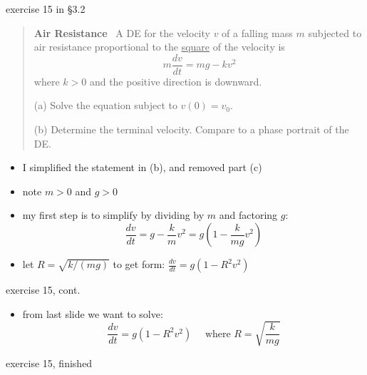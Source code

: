 \documentclass[colorlinks]{beamer}
\begin{document}
\begin{frame}{exercise 15 in \S3.2}

\begin{quotation}
\noindent \textbf{Air Resistance} \, A DE for the velocity $v$ of a falling mass $m$ subjected to air resistance proportional to the \underline{square} of the velocity is
    $$m \frac{dv}{dt} = m g - k v^2$$
where $k>0$ and the positive direction is downward.

(a) Solve the equation subject to $v(0)=v_0$.

(b) Determine the terminal velocity.  Compare to a phase portrait of the DE.
\end{quotation}

\begin{itemize}
\item I simplified the statement in (b), and removed part (c)
\item note $m>0$ and $g>0$
\item my first step is to simplify by dividing by $m$ and factoring $g$:
    $$\frac{dv}{dt} = g - \frac{k}{m} v^2 = g \left(1 - \frac{k}{mg} v^2\right)$$
\item let $R=\sqrt{k/(mg)}$ to get form: $\frac{dv}{dt} = g \left(1 - R^2 v^2\right)$
\end{itemize}
\end{frame}


\begin{frame}{exercise 15, cont.}

\begin{itemize}
\item from last slide we want to solve:
   $$\frac{dv}{dt} = g \left(1 - R^2 v^2\right) \quad \text{ where } R=\sqrt{\frac{k}{mg}}$$
\end{itemize}

\vspace{60mm}
\end{frame}


\begin{frame}{exercise 15, finished}

\end{frame}
\end{document}
